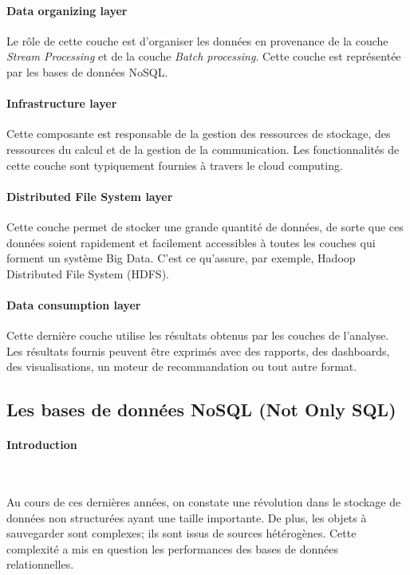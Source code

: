 		\paragraph{Data organizing layer} Le rôle de cette couche est d'organiser les données en provenance de la  couche  \textit{Stream Processing} et de la couche \textit{Batch processing}. Cette couche est représentée par les bases de données NoSQL. 
		\paragraph{Infrastructure layer} Cette composante est responsable de la gestion des ressources de stockage, des ressources du calcul et de la gestion de la communication. Les fonctionnalités de cette couche sont typiquement fournies à travers le cloud computing.
		\paragraph{Distributed File System layer} Cette couche permet de stocker une grande quantité de données, de sorte que ces données soient rapidement et facilement accessibles à toutes les couches qui forment un système  Big Data. C'est ce qu'assure, par exemple, Hadoop Distributed File System (HDFS).
		\paragraph{Data consumption layer} Cette dernière couche utilise les résultats obtenus par les couches de l'analyse. Les résultats fournis peuvent être exprimés avec des rapports, des dashboards, des visualisations, un moteur de recommandation ou tout autre format.
	\subsection{Les bases de données NoSQL (Not Only SQL) } \label{sec:nosql}
	\paragraph{Introduction } ~
	
    Au cours de ces dernières années, on constate une révolution dans le stockage de données non structurées ayant une taille importante.  De plus,  les objets à sauvegarder sont complexes; ils sont issus de sources hétérogènes.  Cette complexité a mis en question les performances des bases de données relationnelles. 
	
